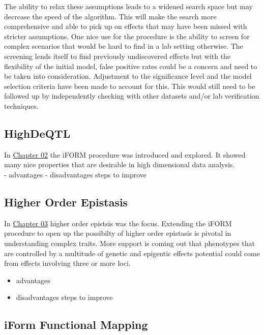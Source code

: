 \documentclass[11pt,]{book}
\providecommand{\tightlist}{%
  \setlength{\itemsep}{0pt}\setlength{\parskip}{0pt}}
\theoremstyle{definition}
\theoremstyle{definition}
\theoremstyle{remark}
\begin{document}
The ability to relax these assumptions leads to a widened search space
but may decrease the speed of the algorithm. This will make the search
more comprehensive and able to pick up on effects that may have been
missed with stricter assumptions. One nice use for the procedure is the
ability to screen for complex scenarios that would be hard to find in a
lab setting otherwise. The screening lends itself to find previously
undiscovered effects but with the flexibility of the initial model,
false positive rates could be a concern and need to be taken into
consideration. Adjustment to the significance level and the model
selection criteria have been made to account for this. This would still
need to be followed up by independently checking with other datasets
and/or lab verification techniques.

\subsection{HighDeQTL}\label{highdeqtl-1}

In \protect\hyperlink{highdeqtl}{Chapter 02} the iFORM procedure was
introduced and explored. It showed many nice properties that are
desirable in high dimensional data analysis.\\
- advantages - disadvantages steps to improve

\subsection{Higher Order Epistasis}\label{higher-order-epistasis-1}

In \protect\hyperlink{highorder}{Chapter 03} higher order epistsis was
the focus. Extending the iFORM procedure to open up the possibilty of
higher order epistasis is pivotal in understanding complex traits. More
support is coming out that phenotypes that are controlled by a multitude
of genetic and epigentic effects potential could come from effects
involving three or more loci.

\begin{itemize}
\tightlist
\item
  advantages
\item
  disadvantages steps to improve
\end{itemize}

\subsection{iForm Functional Mapping}\label{iform-functional-mapping}
\end{document}
